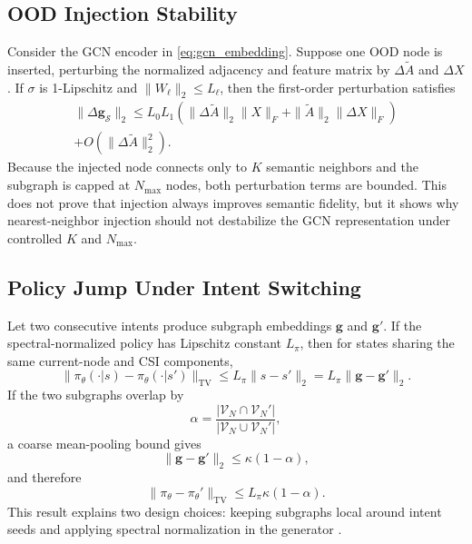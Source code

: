 \documentclass[journal]{IEEEtran}
\newcommand{\SG}{\mathcal{S}}
\newcommand{\calV}{\mathcal{V}}
\begin{document}
\subsection{OOD Injection Stability}

Consider the GCN encoder in \eqref{eq:gcn_embedding}. Suppose one OOD node is inserted, perturbing the normalized adjacency and feature matrix by $\Delta\tilde{A}$ and $\Delta X$. If $\sigma$ is 1-Lipschitz and $\|W_\ell\|_2\leq L_\ell$, then the first-order perturbation satisfies
\begin{multline}
\|\Delta \mathbf{g}_{\SG}\|_2
\leq
L_0L_1\left(
\|\Delta\tilde{A}\|_2\|X\|_F
+\|\tilde{A}\|_2\|\Delta X\|_F
\right)\\
+O(\|\Delta\tilde{A}\|_2^2).
\label{eq:ood_bound}
\end{multline}
Because the injected node connects only to $K$ semantic neighbors and the subgraph is capped at $N_{\max}$ nodes, both perturbation terms are bounded. This does not prove that injection always improves semantic fidelity, but it shows why nearest-neighbor injection should not destabilize the GCN representation under controlled $K$ and $N_{\max}$.

\subsection{Policy Jump Under Intent Switching}

Let two consecutive intents produce subgraph embeddings $\mathbf{g}$ and $\mathbf{g}'$. If the spectral-normalized policy has Lipschitz constant $L_\pi$, then for states sharing the same current-node and CSI components,
\begin{equation}
\|\pi_\theta(\cdot|s)-\pi_\theta(\cdot|s')\|_{\mathrm{TV}}
\leq L_\pi \|s-s'\|_2
=L_\pi \|\mathbf{g}-\mathbf{g}'\|_2.
\label{eq:tv_bound}
\end{equation}
If the two subgraphs overlap by
\begin{equation}
\alpha=\frac{|\calV_N\cap\calV_N'|}{|\calV_N\cup\calV_N'|},
\end{equation}
a coarse mean-pooling bound gives
\begin{equation}
\|\mathbf{g}-\mathbf{g}'\|_2
\leq \kappa(1-\alpha),
\end{equation}
and therefore
\begin{equation}
\|\pi_\theta-\pi_\theta'\|_{\mathrm{TV}}
\leq L_\pi\kappa(1-\alpha).
\label{eq:overlap_bound}
\end{equation}
This result explains two design choices: keeping subgraphs local around intent seeds and applying spectral normalization in the generator \cite{miyato2018spectral}.
\end{document}
